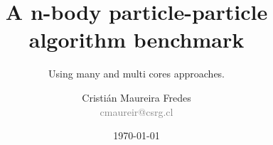 \documentclass{beamer}
\author[C. Maureira]{\large Cristián Maureira Fredes\\\normalsize \textcolor{gray}{cmaureir@csrg.cl}}
\title[n-body benchmark]{A n-body particle-particle algorithm benchmark}
\subtitle{Using many and multi cores approaches.}
\institute[UTFSM]{Departamento de Informática\\Universidad Técnica Federico Santa María}
\date{\today}
\begin{document}
\begin{frame}[t,plain]
\titlepage
\end{frame}



\begin{frame}[t,plain]
\titlepage
\end{frame}
\end{document}
